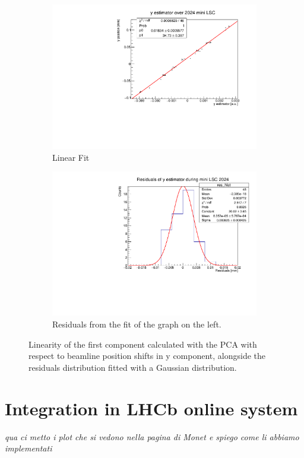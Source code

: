 \begin{figure}
    \centering
    \begin{subfigure}{0.48\textwidth}
    \includegraphics[width=\linewidth]{figures/y_fit_new.pdf}
    \caption{Linear Fit}\label{fig:yfit_data}
    \end{subfigure}
    \begin{subfigure}{0.48\textwidth}
    \includegraphics[width=\linewidth]{figures/y_res_new.pdf}
    \caption{Residuals from the fit of the graph on the left. }\label{fig:yres_data}
    \end{subfigure}
    \caption{Linearity of the first component calculated with the PCA with respect to beamline position shifts in y component, alongside the residuals distribution fitted with a Gaussian distribution.}
    \label{fig:y_MC}
\end{figure}









\section{Integration in LHCb online system}
\textit{qua ci metto i plot che si vedono nella pagina di Monet e spiego come li abbiamo implementati}
